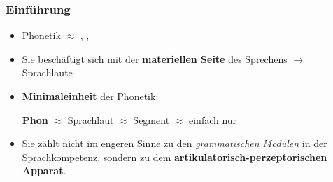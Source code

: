 \begin{frame}
\frametitle{Einführung}

	\begin{itemize}
		\item Phonetik $\approx$ , , 
		\item Sie beschäftigt sich mit der \textbf{materiellen Seite} des Sprechens $\rightarrow$ Sprachlaute 
		\item \textbf{Minimaleinheit} der Phonetik:\par%
                      \textbf{Phon} $\approx$ Sprachlaut $\approx$ Segment $\approx$ einfach nur 
		\item Sie zählt nicht im engeren Sinne zu den \textit{grammatischen Modulen} in der Sprachkompetenz, sondern zu dem \textbf{artikulatorisch-perzeptorischen Apparat}.
	\end{itemize}
	
\end{frame}


